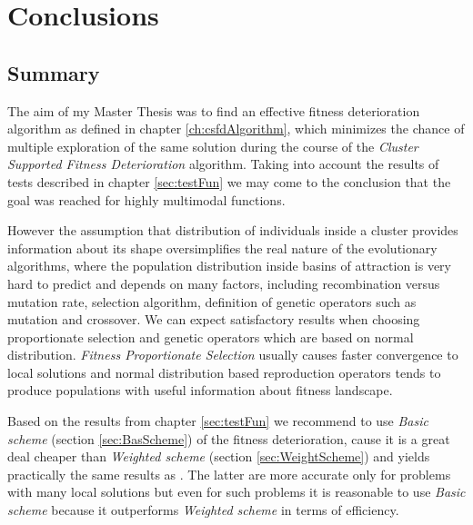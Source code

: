 
\chapter{Conclusions}
\label{ch:Conclusions}

\section{Summary}
The aim of my Master Thesis was to find an effective fitness deterioration
algorithm as defined in chapter \ref{ch:csfdAlgorithm}, which minimizes the
chance of multiple exploration of the same solution during the course of the \textit{Cluster Supported Fitness
Deterioration} algorithm. Taking into account the results of tests described in
chapter \ref{sec:testFun} we may come to the conclusion that the goal was
reached for highly multimodal functions.

However the assumption that distribution of individuals inside a cluster
provides information about its shape oversimplifies the real nature of the evolutionary
algorithms, where the population distribution inside basins of attraction is 
very hard to predict and depends on many factors, including recombination versus
mutation rate, selection algorithm, definition of genetic operators such as
mutation and crossover. We can expect satisfactory results when
choosing proportionate selection and genetic operators which are based on normal
distribution. \textit{Fitness Proportionate Selection} usually causes faster
convergence to local solutions and normal distribution based reproduction operators tends 
to produce populations with useful information about fitness landscape.

Based on the results from chapter \ref{sec:testFun} we recommend to use
\textit{Basic scheme} (section \ref{sec:BasScheme}) of the fitness
deterioration, cause it is a great deal cheaper than \textit{Weighted scheme}
(section \ref{sec:WeightScheme}) and yields practically the same results as
. The latter are more accurate only for problems with many local solutions but even for such problems it is reasonable to use \textit{Basic scheme}
because it outperforms \textit{Weighted scheme} in terms of efficiency. 

